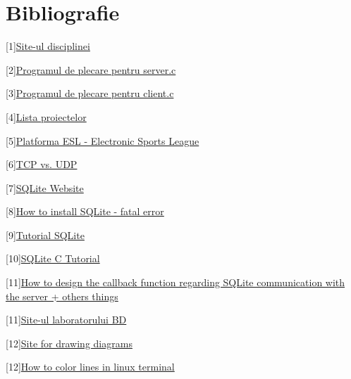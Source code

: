 \documentclass{article}
\begin{document}
\section{Bibliografie}

\quad 

[1]\href{https://profs.info.uaic.ro/~computernetworks/index.php} {Site-ul disciplinei}



[2]\href{https://profs.info.uaic.ro/~computernetworks/files/NetEx/S12/ServerConcThread/servTcpConcTh2.c} {Programul de plecare pentru server.c}

[3]\href{https://profs.info.uaic.ro/~computernetworks/files/NetEx/S12/ServerConcThread/cliTcpNr.c} {Programul de plecare pentru client.c}

[4]\href{https://profs.info.uaic.ro/~computernetworks/ProiecteNet2020.php}{Lista proiectelor}

[5]\href{https://play.eslgaming.com/global}{Platforma ESL - Electronic Sports League}

[6]\href{https://www.guru99.com/tcp-vs-udp-understanding-the-difference.html#:~:text=TCP}{TCP vs. UDP}

[7]\href{https://www.sqlite.org/index.html}{SQLite Website}

[8]\href{https://stackoverflow.com/questions/28969543/fatal-error-sqlite3-h-no-such-file-or-directory/31764947}{How to install SQLite - fatal error}

[9]\href{https://www.youtube.com/watch?v=YVNGUqARjHg&ab_channel=AsimCode}{Tutorial SQLite}

[10]\href{http://zetcode.com/db/sqlitec/}{SQLite C Tutorial}

[11]\href{https://www.tutorialspoint.com/sqlite/sqlite_c_cpp.htm}{How to design the callback function regarding SQLite communication with the server + others things}

[11]\href{https://profs.info.uaic.ro/~bd/wiki/index.php/Pagina_principal%C4%83}{Site-ul laboratorului BD}

[12]\href{https://online.visual-paradigm.com/drive/#diagramlist:proj=0&new=HowHowDiagram}{Site for drawing diagrams}

[12]\href{https://askubuntu.com/questions/558280/changing-colour-of-text-and-background-of-terminal}{How to color lines in linux terminal}
\end{document}
